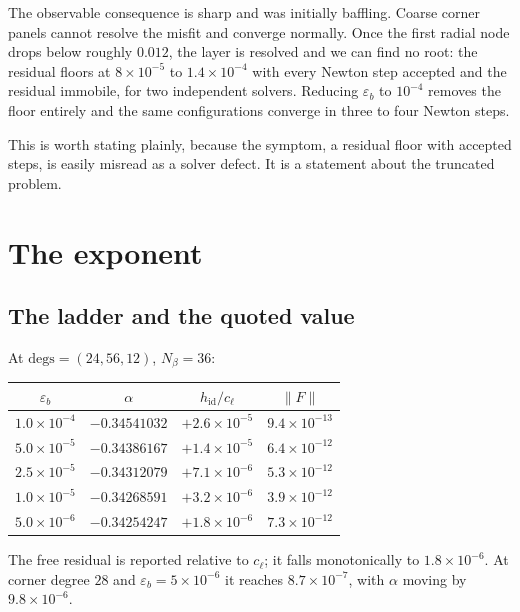 \documentclass[11pt]{article}
\newcommand{\hid}{h_{\mathrm{id}}}
\begin{document}
The observable consequence is sharp and was initially baffling. Coarse corner panels
cannot resolve the misfit and converge normally. Once the first radial node drops below
roughly $0.012$, the layer is resolved and we can find no root: the residual floors at
$8\times10^{-5}$ to $1.4\times10^{-4}$ with every Newton step accepted and the residual
immobile, for two independent solvers. Reducing $\varepsilon_b$ to $10^{-4}$ removes the
floor entirely and the same configurations converge in three to four Newton steps.

This is worth stating plainly, because the symptom, a residual floor with accepted
steps, is easily misread as a solver defect. It is a statement about the truncated
problem.

\section{The exponent}

\subsection{The ladder and the quoted value}

At $\mathrm{degs} = (24,56,12)$, $N_\beta = 36$:

\begin{center}
\begin{tabular}{cccc}
\toprule
$\varepsilon_b$ & $\alpha$ & $\hid/c_\ell$ & $\|F\|$ \\
\midrule
$1.0\times10^{-4}$ & $-0.34541032$ & $+2.6\times10^{-5}$ & $9.4\times10^{-13}$ \\
$5.0\times10^{-5}$ & $-0.34386167$ & $+1.4\times10^{-5}$ & $6.4\times10^{-12}$ \\
$2.5\times10^{-5}$ & $-0.34312079$ & $+7.1\times10^{-6}$ & $5.3\times10^{-12}$ \\
$1.0\times10^{-5}$ & $-0.34268591$ & $+3.2\times10^{-6}$ & $3.9\times10^{-12}$ \\
$5.0\times10^{-6}$ & $-0.34254247$ & $+1.8\times10^{-6}$ & $7.3\times10^{-12}$ \\
\bottomrule
\end{tabular}
\end{center}

The free residual is reported relative to $c_\ell$; it falls monotonically to
$1.8\times10^{-6}$. At corner degree $28$ and $\varepsilon_b = 5\times10^{-6}$ it
reaches $8.7\times10^{-7}$, with $\alpha$ moving by $9.8\times10^{-6}$.
\end{document}
